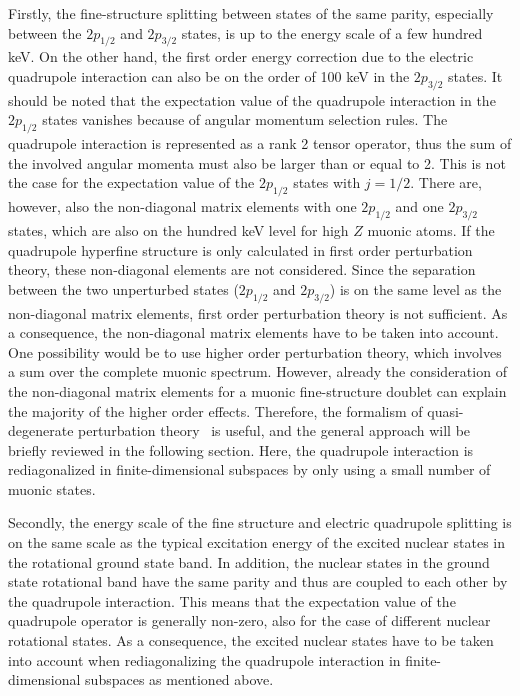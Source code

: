 Firstly, the fine-structure splitting between states of the same parity, especially between the $2p_{1/2}$ and $2p_{3/2}$ states, is up to the energy scale of a few hundred keV. On the other hand, the first order energy correction due to the electric quadrupole interaction can also be on the order of 100 keV in the $2p_{3/2}$ states. It should be noted that the expectation value of the quadrupole interaction in the $2p_{1/2}$ states vanishes because of angular momentum selection rules. The quadrupole interaction is represented as a rank 2 tensor operator, thus the sum of the involved angular momenta must also be larger than or equal to 2. This is not the case for the expectation value of the $2p_{1/2}$ states with $j=1/2$. There are, however, also the non-diagonal matrix elements with one $2p_{1/2}$ and one $2p_{3/2}$ states, which are also on the hundred keV level for high $Z$ muonic atoms. If the quadrupole hyperfine structure is only calculated in first order perturbation theory, these non-diagonal elements are not considered. Since the separation between the two unperturbed states ($2p_{1/2}$ and $2p_{3/2}$) is on the same level as the non-diagonal matrix elements, first order perturbation theory is not sufficient. As a consequence, the non-diagonal matrix elements have to be taken into account. One possibility would be to use higher order perturbation theory, which involves a sum over the complete muonic spectrum. However, already the consideration of the non-diagonal matrix elements for a muonic fine-structure doublet can explain the majority of the higher order effects. Therefore, the formalism of quasi-degenerate perturbation theory~\cite{sakurai1994} is useful, and the general approach will be briefly reviewed in the following section. Here, the quadrupole interaction is rediagonalized in finite-dimensional subspaces by only using a small number of muonic states.

Secondly, the energy scale of the fine structure and electric quadrupole splitting is on the same scale as the typical excitation energy of the excited nuclear states in the rotational ground state band. In addition, the nuclear states in the ground state rotational band have the same parity and thus are coupled to each other by the quadrupole interaction. This means that the expectation value of the quadrupole operator is generally non-zero, also for the case of different nuclear rotational states. As a consequence, the excited nuclear states have to be taken into account when rediagonalizing the quadrupole interaction in finite-dimensional subspaces as mentioned above.

